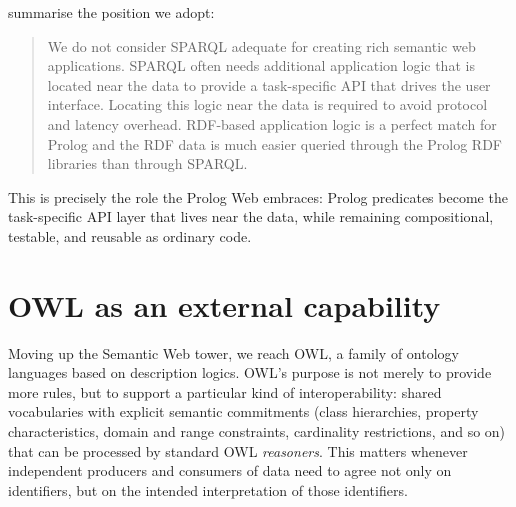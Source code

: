 \medskip

\noindent \citet{wielemaker2016cliopatria} summarise the position we adopt:

\begin{quotation}
We do not consider SPARQL adequate for creating rich semantic web applications. SPARQL often needs additional application logic that is located near the data to provide a task-specific API that drives the user interface. Locating this logic near the data is required to avoid protocol and latency overhead. RDF-based application logic is a perfect match for Prolog and the RDF data is much easier queried through the Prolog RDF libraries than through SPARQL.
\end{quotation}
 
\noindent This is precisely the role the Prolog Web embraces: Prolog predicates become the task-specific API layer that lives near the data, while remaining compositional, testable, and reusable as ordinary code.

\section{OWL as an external capability}\label{sec:instead-of-owl}

Moving up the Semantic Web tower, we reach OWL, a family of ontology languages based on description logics. OWL's purpose is not merely to provide more rules, but to support a particular kind of interoperability: shared vocabularies with explicit semantic commitments (class hierarchies, property characteristics, domain and range constraints, cardinality restrictions, and so on) that can be processed by standard OWL \textit{reasoners}. This matters whenever independent producers and consumers of data need to agree not only on identifiers, but on the intended interpretation of those identifiers.


